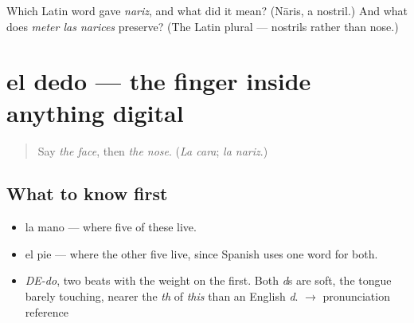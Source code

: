 \begin{tcolorbox}[breakable,colback=teal!4,colframe=teal!35!black,title={Before you move on}]
Which Latin word gave \emph{nariz}, and what did it mean? (Nāris, a nostril.) And what does \emph{meter las narices} preserve? (The Latin plural — nostrils rather than nose.)
\end{tcolorbox}
\section[el dedo]{el dedo — the finger inside anything digital}

\label{lesson:ES-C364-dedo}



\begin{quote}
Say \emph{the face}, then \emph{the nose}. (\emph{La cara}; \emph{la nariz}.)
\end{quote}

\subsection*{What to know first}
\begin{itemize}
\raggedright
  \item la mano — where five of these live.
  \item el pie — where the other five live, since Spanish uses one word for both.
\end{itemize}

\begin{sounds}
\begin{itemize}
\raggedright
  \item \emph{DE-do}, two beats with the weight on the first. Both \emph{d}s are soft, the tongue barely touching, nearer the \emph{th} of \emph{this} than an English \emph{d}. $\to$ pronunciation reference
\end{itemize}
\end{sounds}

